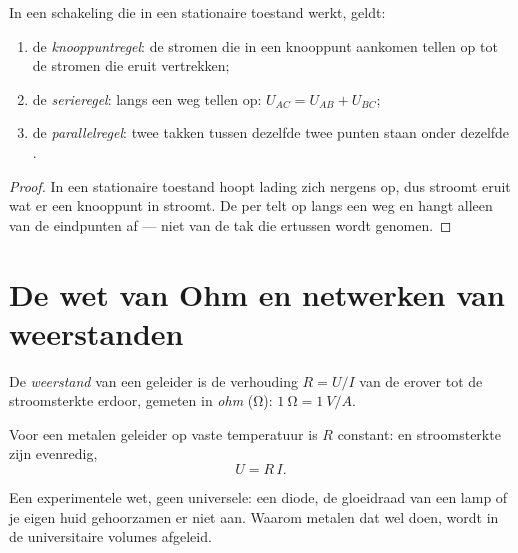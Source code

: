 \begin{proposition}\label{prop:g11:circuits-and-power:laws}
In een schakeling die in een stationaire toestand werkt, geldt:
\begin{enumerate}
  \item de \emph{knooppuntregel}: de stromen die in een knooppunt
        aankomen tellen op tot de stromen die eruit vertrekken;
  \item de \emph{serieregel}:  langs een weg tellen op:
        $U_{AC} = U_{AB} + U_{BC}$;
  \item de \emph{parallelregel}: twee takken tussen dezelfde twee punten
        staan onder dezelfde .
\end{enumerate}
\end{proposition}

\begin{proof}
In een stationaire toestand hoopt lading zich nergens op, dus stroomt
eruit wat er een knooppunt in stroomt. De  per  telt op
langs een weg en hangt alleen van de eindpunten af --- niet van de tak
die ertussen wordt genomen.
\end{proof}

\section{De wet van Ohm en netwerken van weerstanden}

\begin{definition}[Weerstand]\label{def:g11:circuits-and-power:resistance}
De \emph{weerstand} van een geleider is de verhouding
$R = U/I$ van de  erover tot de stroomsterkte erdoor, gemeten in
\emph{ohm} (\unit{\ohm}): $\qty{1}{\ohm} = \qty{1}{V/A}$.
\end{definition}

\begin{proposition}\label{prop:g11:circuits-and-power:ohm}
Voor een metalen geleider op vaste temperatuur is $R$ constant: 
en stroomsterkte zijn evenredig,
\[ U = R\,I . \]
\end{proposition}
\admitted

\begin{remark}\label{rem:g11:circuits-and-power:ohm-limits}
Een experimentele wet, geen universele: een diode, de gloeidraad van een
lamp of je eigen huid gehoorzamen er niet aan. Waarom metalen dat wel
doen, wordt in de universitaire volumes afgeleid.
\end{remark}

